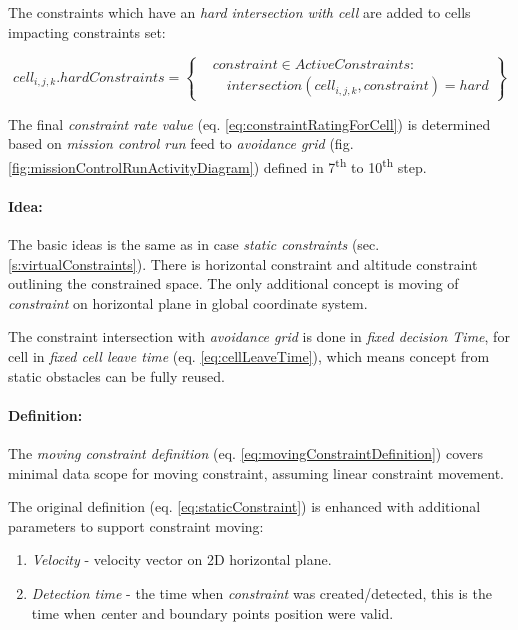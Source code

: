 \noindent The constraints which have an \emph{hard intersection with cell} are added to cells impacting constraints set:

\begin{equation}\label{eq:hardConstraintsCellIntersections}
    cell_{i,j,k}. hard Constraints = 
    \left\{
        \begin{aligned}
            &constraint \in Active Constraints:\\ 
            &\quad intersection(cell_{i,j,k},constraint) = hard
        \end{aligned}
    \right\}
\end{equation}

\begin{note}
    The final \emph{constraint rate value} (eq. \ref{eq:constraintRatingForCell}) is determined based on \emph{mission control run} feed to \emph{avoidance grid} (fig. \ref{fig:missionControlRunActivityDiagram}) defined in 7\textsuperscript{th} to 10\textsuperscript{th} step.
\end{note}

\paragraph{Idea:} The basic ideas is the same as in case \emph{static constraints} (sec. \ref{s:virtualConstraints}). There is horizontal constraint and altitude constraint outlining the constrained space. The only additional concept is moving of \emph{constraint} on horizontal plane in global coordinate system. 

The constraint intersection  with \emph{avoidance grid} is done in \emph{fixed decision Time}, for cell in \emph{fixed cell leave time} (eq. \ref{eq:cellLeaveTime}), which means concept from static obstacles can be fully reused.

\paragraph{Definition:} The \emph{moving constraint definition} (eq. \ref{eq:movingConstraintDefinition}) covers minimal data scope for  moving constraint, assuming linear constraint movement. 

The original definition (eq. \ref{eq:staticConstraint}) is enhanced with additional parameters to support constraint moving:

\begin{enumerate}
    \item \emph{Velocity} - velocity vector on 2D horizontal plane.
    
    \item \emph{Detection time} - the time when \emph{constraint} was created/detected, this is the time when \emph center and boundary points position were valid.
\end{enumerate}


